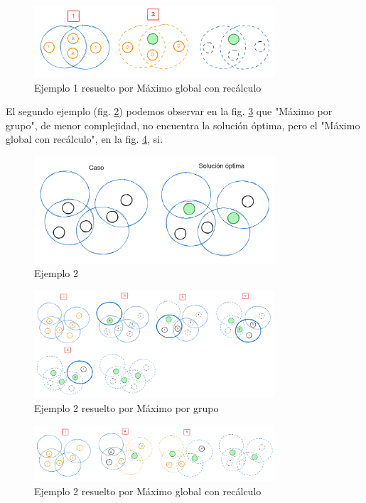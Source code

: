 \begin{figure}[H]
    \centering
    \includegraphics[width=0.8\textwidth]{img/greedy_ej1_mgr.png}
    \caption{Ejemplo 1 resuelto por Máximo global con recálculo}
    \label{fig:greedy_ej1_mgr}
\end{figure}

El segundo ejemplo (fig. \ref{fig:greedy_ej2}) podemos observar en la fig. \ref{fig:greedy_ej2_mpg} que "Máximo por grupo", de menor complejidad, no encuentra la solución óptima, pero el "Máximo global con recálculo", en la fig. \ref{fig:greedy_ej2_mgr}, si.

\begin{figure}[H]
    \centering
    \includegraphics[width=0.8\textwidth]{img/greedy_ej2.png}
    \caption{Ejemplo 2}
    \label{fig:greedy_ej2}
\end{figure}

\begin{figure}[H]
    \centering
    \includegraphics[width=0.8\textwidth]{img/greedy_ej2_mpg.png}
    \caption{Ejemplo 2 resuelto por Máximo por grupo}
    \label{fig:greedy_ej2_mpg}
\end{figure}

\begin{figure}[H]
    \centering
    \includegraphics[width=0.8\textwidth]{img/greedy_ej2_mgr.png}
    \caption{Ejemplo 2 resuelto por Máximo global con recálculo}
    \label{fig:greedy_ej2_mgr}
\end{figure}

